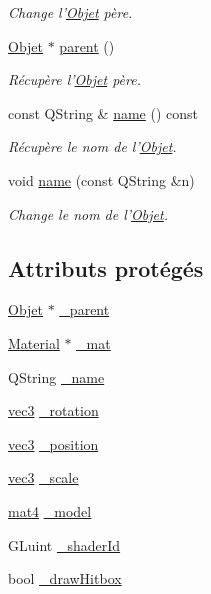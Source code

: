 \begin{DoxyCompactItemize}
\begin{DoxyCompactList}\small\item\em Change l'\hyperlink{class_objet}{Objet} père. \end{DoxyCompactList}\item 
\hyperlink{class_objet}{Objet} $\ast$ \hyperlink{class_objet_aaa3c3290e5bb742363263600fcdb3e5e}{parent} ()
\begin{DoxyCompactList}\small\item\em Récupère l'\hyperlink{class_objet}{Objet} père. \end{DoxyCompactList}\item 
const Q\+String \& \hyperlink{class_objet_a4a702c189bedcbf1e65da6aec72c8e44}{name} () const 
\begin{DoxyCompactList}\small\item\em Récupère le nom de l'\hyperlink{class_objet}{Objet}. \end{DoxyCompactList}\item 
void \hyperlink{class_objet_a9fcc9af481f4e13f46ab7d1b40cf91fc}{name} (const Q\+String \&n)
\begin{DoxyCompactList}\small\item\em Change le nom de l'\hyperlink{class_objet}{Objet}. \end{DoxyCompactList}\end{DoxyCompactItemize}
\subsection*{Attributs protégés}
\begin{DoxyCompactItemize}
\item 
\hyperlink{class_objet}{Objet} $\ast$ \hyperlink{class_objet_a91c5a50011c3fe9233a645aa767a275f}{\+\_\+parent}
\item 
\hyperlink{class_material}{Material} $\ast$ \hyperlink{class_objet_aefea82be8c63504190ac63d5e44ff61a}{\+\_\+mat}
\item 
Q\+String \hyperlink{class_objet_ac19f568a794dd9387386ee71914a868e}{\+\_\+name}
\item 
\hyperlink{structvec3}{vec3} \hyperlink{class_objet_a1d8675e88cc98ba740292af1421c2ee1}{\+\_\+rotation}
\item 
\hyperlink{structvec3}{vec3} \hyperlink{class_objet_a6c1a10fa5f4c5cd0e0617d93f42d927b}{\+\_\+position}
\item 
\hyperlink{structvec3}{vec3} \hyperlink{class_objet_a3fee0c5016edddf7c4b9a0b55ef44752}{\+\_\+scale}
\item 
\hyperlink{structmat4}{mat4} \hyperlink{class_objet_a1963cca59f62c7a6f69a9c2c461ad9ea}{\+\_\+model}
\item 
G\+Luint \hyperlink{class_objet_af0d545a506dbfa377c8ca5a499fdf755}{\+\_\+shader\+Id}
\item 
bool \hyperlink{class_objet_a953ad7ff9941575d1f18b6d256d2dcdc}{\+\_\+draw\+Hitbox}
\end{DoxyCompactItemize}
